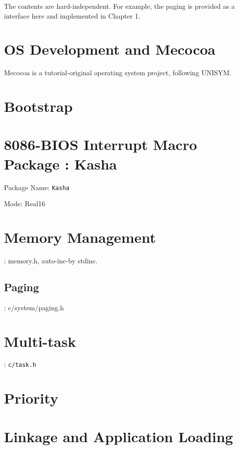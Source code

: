 
The contents are hard-independent. For example, the paging is provided as a interface here and implemented in Chapter 1.

\section{OS Development and Mecocoa}

Mecocoa is a tutorial-original operating system project, following UNISYM.

\section{Bootstrap}


\section{8086-BIOS Interrupt Macro Package : Kasha}

Package Name: \verb|Kasha| %

Mode: Real16



\section{Memory Management}
: memory.h, auto-inc-by stdinc.

\subsection{Paging}

: c/system/paging.h

\section{Multi-task}
: \verb|c/task.h|

\section{Priority}






\section{Linkage and Application Loading}


